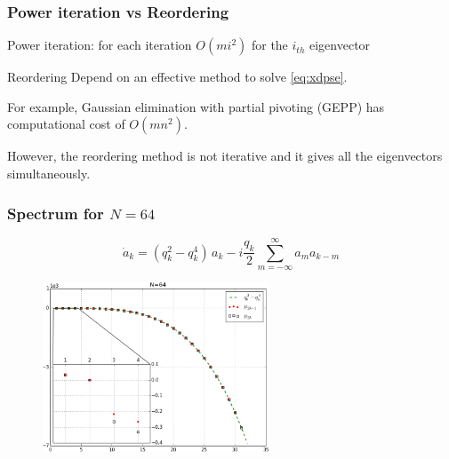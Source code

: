\documentclass[mathserif, handout]{beamer}
\begin{document}
\begin{frame}
  \frametitle{Power iteration vs Reordering}

  \begin{block}{Power iteration: for each iteration}
     $O(mi^{2})$ for the $i_{th}$ eigenvector
  \end{block}

  \pause

  \begin{block}{Reordering}
    Depend on an effective method to solve \textbf{\pse} \eqref{eq:xdpse}.
    \vspace{0em}

    For
    example, {\color{cyan} Gaussian  elimination with partial pivoting} (GEPP)
    has computational cost of $O(mn^{2})$.
  \end{block}

  \pause

  However,  the reordering method is {\color{red} not iterative} and
  it gives all the eigenvectors {\color{red} simultaneously}.
\end{frame}

\begin{frame}
  \frametitle{Spectrum for $N=64$}
  \[
  \dot{a}_k  =
  ( q_k^2 - q_k^4 )\, a_k
  - i \frac{q_k}{2} \sum_{m=-\infty}^{\infty} a_m a_{k-m}
  \]
    
  \begin{figure}[h]
    \centering
    \includegraphics[width=0.6\textwidth]{KSspectrum}
  \end{figure}
\end{frame}
\end{document}
